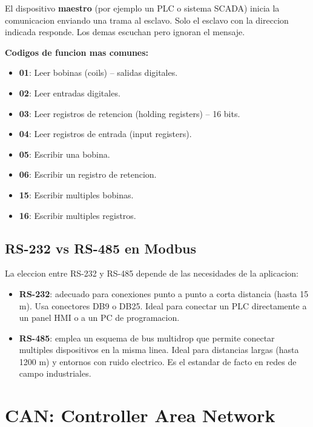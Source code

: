 El dispositivo \textbf{maestro} (por ejemplo un PLC o sistema SCADA) inicia la
comunicacion enviando una trama al esclavo. Solo el esclavo con la direccion
indicada responde. Los demas escuchan pero ignoran el mensaje.

\textbf{Codigos de funcion mas comunes:}
\begin{itemize}
    \item \textbf{01}: Leer bobinas (coils) -- salidas digitales.
    \item \textbf{02}: Leer entradas digitales.
    \item \textbf{03}: Leer registros de retencion (holding registers) -- 16 bits.
    \item \textbf{04}: Leer registros de entrada (input registers).
    \item \textbf{05}: Escribir una bobina.
    \item \textbf{06}: Escribir un registro de retencion.
    \item \textbf{15}: Escribir multiples bobinas.
    \item \textbf{16}: Escribir multiples registros.
\end{itemize}

\subsection{RS-232 vs RS-485 en Modbus}

La eleccion entre RS-232 y RS-485 depende de las necesidades de la aplicacion:

\begin{itemize}
    \item \textbf{RS-232}: adecuado para conexiones punto a punto a corta distancia
    (hasta 15 m). Usa conectores DB9 o DB25. Ideal para conectar un PLC
    directamente a un panel HMI o a un PC de programacion.
    \item \textbf{RS-485}: emplea un esquema de bus multidrop que permite conectar
    multiples dispositivos en la misma linea. Ideal para distancias largas
    (hasta 1200 m) y entornos con ruido electrico. Es el estandar de facto en
    redes de campo industriales.
\end{itemize}


\section{CAN: Controller Area Network}

